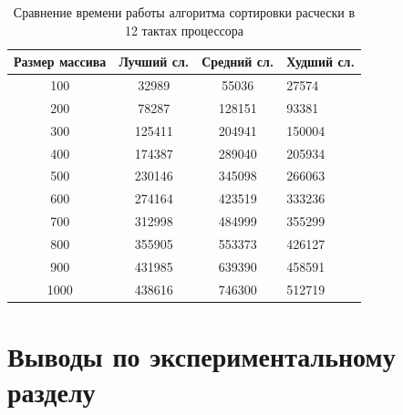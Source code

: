 \documentclass[12pt]{report}
\begin{document}
	\newpage
	
	\begin{table}[h]
		\caption{\label{tab:time3} Сравнение времени работы алгоритма сортировки расчески в
			12
			тактах процессора }
		\begin{center}
			\begin{tabular}{|c|c|c|p{3.8cm}|}
				\hline
				Размер массива & Лучший сл.& Средний сл. & Худший сл. \\ [0.5ex] 
				\hline
				100 & 32989 & 55036 & 27574\\
				\hline
				200 & 78287 & 128151 & 93381\\
				\hline
				300 & 125411 & 204941 & 150004\\
				\hline
				400 & 174387 & 289040 & 205934\\
				\hline
				500 & 230146 & 345098 & 266063\\
				\hline
				600 & 274164 & 423519 & 333236\\
				\hline
				700 & 312998 & 484999 & 355299\\
				\hline
				800 & 355905 & 553373 & 426127\\
				\hline
				900 & 431985 & 639390 & 458591\\
				\hline
				1000 & 438616 & 746300 & 512719\\
				\hline
			\end{tabular}
		\end{center}
	\end{table}
	
	
	
	\section{Выводы по экспериментальному разделу}
	
\end{document}
